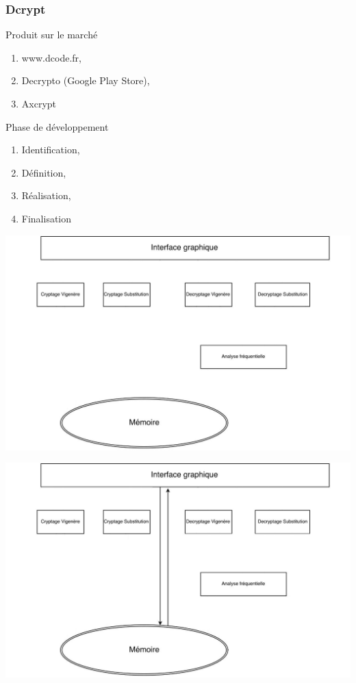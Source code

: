\documentclass[10pt,xcolor=table]{beamer}
\begin{document}
\begin{frame}[<+->]
  \frametitle{Dcrypt}
  
  \begin{exampleblock}{Produit sur le marché}
	\begin{enumerate}
    \item www.dcode.fr,
    \item Decrypto (Google Play Store),
    \item Axcrypt
    \end{enumerate}
  \end{exampleblock}

  \begin{block}{Phase de développement}
   
    \begin{enumerate}
    \item Identification,
    \item Définition,
    \item Réalisation,
    \item Finalisation
    \end{enumerate}
  \end{block}

\end{frame}
\begin{frame}
\includegraphics[scale = 0.22]{Org1.jpg}
\end{frame}
\begin{frame}
\includegraphics[scale = 0.22]{Org2.jpg}
\end{frame}
\end{document}
